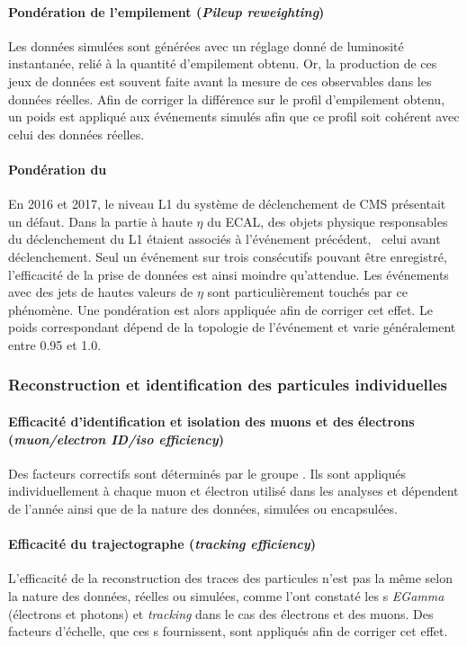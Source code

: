 \paragraph{Pondération de l'empilement (\emph{Pileup reweighting})}
Les données simulées sont générées avec un réglage donné de luminosité instantanée, relié à la quantité d'empilement obtenu.
Or, la production de ces jeux de données est souvent faite avant la mesure de ces observables dans les données réelles.
Afin de corriger la différence sur le profil d'empilement obtenu, un poids est appliqué aux événements simulés afin que ce profil soit cohérent avec celui des données réelles.
\paragraph{Pondération du \prefiring}
En 2016 et 2017, le niveau L1 du système de déclenchement de CMS présentait un défaut.
Dans la partie à haute $\eta$ du ECAL, des objets physique responsables du déclenchement du L1 étaient associés à l'événement précédent, \ie\ celui avant déclenchement.
Seul un événement sur trois consécutifs pouvant être enregistré, l'efficacité de la prise de données est ainsi moindre qu'attendue.
Les événements avec des jets de hautes valeurs de $\eta$ sont particulièrement touchés par ce phénomène.
Une pondération est alors appliquée afin de corriger cet effet.
Le poids correspondant dépend de la topologie de l'événement et varie généralement entre \num{0.95} et \num{1.0}.
\subsubsection{Reconstruction et identification des particules individuelles}
\paragraph{Efficacité d'identification et isolation des muons et des électrons (\emph{muon/electron ID/iso efficiency})}
Des facteurs correctifs sont déterminés par le groupe \Higgs\tau\tau.
Ils sont appliqués individuellement à chaque muon et électron utilisé dans les analyses et dépendent de l'année ainsi que de la nature des données, simulées ou encapsulées.
\paragraph{Efficacité du trajectographe (\emph{tracking efficiency})}
L'efficacité de la reconstruction des traces des particules n'est pas la même selon la nature des données, réelles ou simulées, comme l'ont constaté les \POG s \emph{EGamma} (électrons et photons) et \emph{tracking} dans le cas des électrons et des muons.
Des facteurs d'échelle, que ces \POG s fournissent, sont appliqués afin de corriger cet effet.
